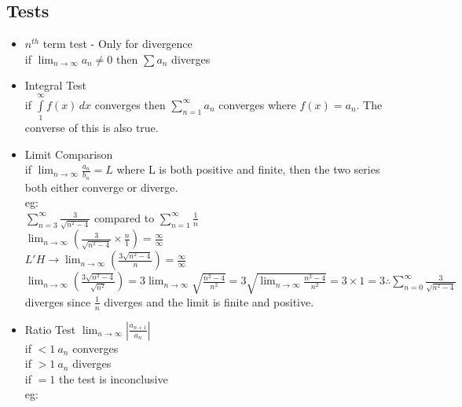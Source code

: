 \documentclass{article}
\begin{document}
  \subsection*{Tests}
  \begin{itemize}
    \item $n^{th}$ term test - Only for divergence\\
      \subitem if \( \lim_{n\rightarrow\infty}a_n\neq0 \) then \( \sum
      a_n\) diverges\\
    \item Integral Test\\
      \subitem if \( \int\limits_{1}^{\infty} f(x) \, dx \) converges
      then \( \sum\limits_{n=1}^{\infty} a_n\) converges where \(
      f(x)=a_n\). The converse of this is also true.\\
    \item Limit Comparison\\
      \subitem if \( \lim_{n\rightarrow\infty} \frac{a_n}{b_n} = L \)
      where L is both positive and finite, then the two series
      both either converge or diverge.\\
      \subitem eg:\\
      \( \sum\limits_{n=3}^{\infty} \frac{3}{\sqrt{n^2-4}} \)
      compared to 
      \( \sum\limits_{n=1}^{\infty}\frac{1}{n} \)\\
      \( \lim_{n\rightarrow\infty}\left( \frac{3}{\sqrt{n^2-4}}
      \times \frac{n}{1} \right)=\frac{\infty}{\infty}\)\\
      \(L'H \rightarrow \lim_{n\rightarrow\infty}\left(
      \frac{3\sqrt{n^2-4}}{n} \right)=\frac{\infty}{\infty}\)\\
      \(\lim_{n\rightarrow\infty}\left(
      \frac{3\sqrt{n^2-4}}{\sqrt{n^2}} \right) =
      3\lim_{n\rightarrow\infty}\sqrt{\frac{n^2-4}{n^2}} =
      3\sqrt{\lim_{n\rightarrow\infty}\frac{n^2-4}{n^2}} =
      3 \times 1 = 3 \therefore \sum\limits_{n=0}^{\infty}
      \frac{3}{\sqrt{n^2-4}}\) diverges since \( \frac{1}{n} \)
      diverges and the limit is finite and positive.\\
    \item Ratio Test
      \subitem \(\lim_{n\rightarrow\infty}\left|
      \frac{a_{n+1}}{a_n} \right|\)\\
      if \(<1 ~ a_n\) converges\\
      if \(>1 ~ a_n\) diverges\\
      if \(=1\) the test is inconclusive\\
      \subitem eg:\\

\end{itemize}
\end{document}
